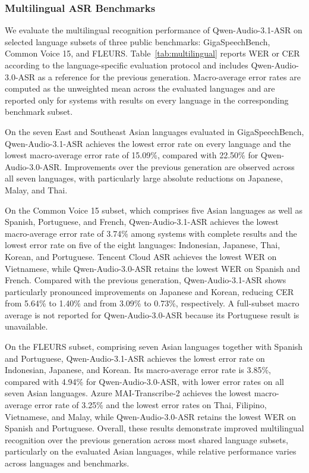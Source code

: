 \documentclass{article}
\begin{document}
%
%
%
%
%
%
%
%

%
%
%
%
%
%

\subsubsection{Multilingual ASR Benchmarks}

We evaluate the multilingual recognition performance of Qwen-Audio-3.1-ASR on selected language subsets of three public benchmarks: GigaSpeechBench, Common Voice 15, and FLEURS. Table~\ref{tab:multilingual} reports WER or CER according to the language-specific evaluation protocol and includes Qwen-Audio-3.0-ASR as a reference for the previous generation. Macro-average error rates are computed as the unweighted mean across the evaluated languages and are reported only for systems with results on every language in the corresponding benchmark subset.

On the seven East and Southeast Asian languages evaluated in GigaSpeechBench, Qwen-Audio-3.1-ASR achieves the lowest error rate on every language and the lowest macro-average error rate of 15.09\%, compared with 22.50\% for Qwen-Audio-3.0-ASR. Improvements over the previous generation are observed across all seven languages, with particularly large absolute reductions on Japanese, Malay, and Thai.

On the Common Voice 15 subset, which comprises five Asian languages as well as Spanish, Portuguese, and French, Qwen-Audio-3.1-ASR achieves the lowest macro-average error rate of 3.74\% among systems with complete results and the lowest error rate on five of the eight languages: Indonesian, Japanese, Thai, Korean, and Portuguese. Tencent Cloud ASR achieves the lowest WER on Vietnamese, while Qwen-Audio-3.0-ASR retains the lowest WER on Spanish and French. Compared with the previous generation, Qwen-Audio-3.1-ASR shows particularly pronounced improvements on Japanese and Korean, reducing CER from 5.64\% to 1.40\% and from 3.09\% to 0.73\%, respectively. A full-subset macro average is not reported for Qwen-Audio-3.0-ASR because its Portuguese result is unavailable.

On the FLEURS subset, comprising seven Asian languages together with Spanish and Portuguese, Qwen-Audio-3.1-ASR achieves the lowest error rate on Indonesian, Japanese, and Korean. Its macro-average error rate is 3.85\%, compared with 4.94\% for Qwen-Audio-3.0-ASR, with lower error rates on all seven Asian languages. Azure MAI-Transcribe-2 achieves the lowest macro-average error rate of 3.25\% and the lowest error rates on Thai, Filipino, Vietnamese, and Malay, while Qwen-Audio-3.0-ASR retains the lowest WER on Spanish and Portuguese. Overall, these results demonstrate improved multilingual recognition over the previous generation across most shared language subsets, particularly on the evaluated Asian languages, while relative performance varies across languages and benchmarks.
\end{document}
